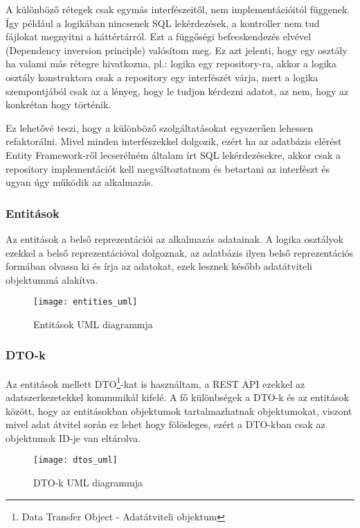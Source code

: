 A különböző rétegek csak egymás interfészeitől, nem implementációitól függenek. Így például a logikában nincsenek SQL lekérdezések, a kontroller nem tud fájlokat megnyitni a háttértárról. Ezt a függőségi befecskendezés elvével (Dependency inversion principle) valósítom meg. Ez azt jelenti, hogy egy osztály ha valami más rétegre hivatkozna, pl.: logika egy repository-ra, akkor a logika osztály konstruktora csak a repository egy interfészét várja, mert a logika szempontjából csak az a lényeg, hogy le tudjon kérdezni adatot, az nem, hogy az konkrétan hogy történik.

Ez lehetővé teszi, hogy a különböző szolgáltatásokat egyszerűen lehessen refaktorálni. Mivel minden interfészekkel dolgozik, ezért ha az adatbázis elérést Entity Framework-ről lecserélném általam írt SQL lekérdezésekre, akkor csak a repository implementációt kell megváltoztatnom és betartani az interfészt és ugyan úgy működik az alkalmazás.

\clearpage

\subsubsection{Entitások}
Az entitások a belső reprezentációi az alkalmazás adatainak. A logika osztályok ezekkel a belső reprezentációval dolgoznak, az adatbázis ilyen belső reprezentációs formában olvassa ki és írja az adatokat, ezek lesznek később adatátviteli objektummá alakítva.

\begin{figure}[H]
	\centering
	\texttt{[image: entities\_uml]}
	\caption{Entitások UML diagrammja}
	\label{fig:entities}
\end{figure}

\clearpage

\subsubsection{DTO-k}
Az entitások mellett DTO\footnote{Data Transfer Object - Adatátviteli objektum}-kat is használtam, a REST API ezekkel az adatszerkezetekkel kommunikál kifelé. A fő különbségek a DTO-k és az entitások között, hogy az entitásokban objektumok tartalmazhatnak objektumokat, viszont mivel adat átvitel során ez lehet hogy fölösleges, ezért a DTO-kban csak az objektumok ID-je van eltárolva.

\begin{figure}[H]
	\centering
	\texttt{[image: dtos\_uml]}
	\caption{DTO-k UML diagrammja}
	\label{fig:dtos}
\end{figure}

